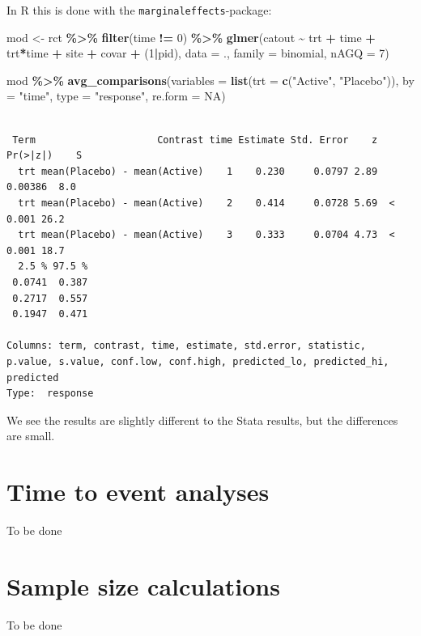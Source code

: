 \documentclass[
]{book}
\newenvironment{Shaded}{\begin{snugshade}}{\end{snugshade}}
\newcommand{\AttributeTok}[1]{\textcolor[rgb]{0.13,0.29,0.53}{#1}}
\newcommand{\ConstantTok}[1]{\textcolor[rgb]{0.56,0.35,0.01}{#1}}
\newcommand{\DecValTok}[1]{\textcolor[rgb]{0.00,0.00,0.81}{#1}}
\newcommand{\FunctionTok}[1]{\textcolor[rgb]{0.13,0.29,0.53}{\textbf{#1}}}
\newcommand{\NormalTok}[1]{#1}
\newcommand{\OtherTok}[1]{\textcolor[rgb]{0.56,0.35,0.01}{#1}}
\newcommand{\SpecialCharTok}[1]{\textcolor[rgb]{0.81,0.36,0.00}{\textbf{#1}}}
\newcommand{\StringTok}[1]{\textcolor[rgb]{0.31,0.60,0.02}{#1}}
\begin{document}
In R this is done with the \texttt{marginaleffects}-package:

\begin{Shaded}
\begin{Highlighting}[]
\NormalTok{mod }\OtherTok{\textless{}{-}}\NormalTok{ rct }\SpecialCharTok{\%\textgreater{}\%}
  \FunctionTok{filter}\NormalTok{(time }\SpecialCharTok{!=} \DecValTok{0}\NormalTok{) }\SpecialCharTok{\%\textgreater{}\%}
  \FunctionTok{glmer}\NormalTok{(catout }\SpecialCharTok{\textasciitilde{}}\NormalTok{ trt }\SpecialCharTok{+}\NormalTok{ time }\SpecialCharTok{+}\NormalTok{ trt}\SpecialCharTok{*}\NormalTok{time }\SpecialCharTok{+}\NormalTok{ site }\SpecialCharTok{+}\NormalTok{ covar }\SpecialCharTok{+}\NormalTok{ (}\DecValTok{1}\SpecialCharTok{|}\NormalTok{pid), }
        \AttributeTok{data =}\NormalTok{ ., }
        \AttributeTok{family =}\NormalTok{ binomial, }
        \AttributeTok{nAGQ =} \DecValTok{7}\NormalTok{)}

\NormalTok{mod }\SpecialCharTok{\%\textgreater{}\%}
  \FunctionTok{avg\_comparisons}\NormalTok{(}\AttributeTok{variables =} \FunctionTok{list}\NormalTok{(}\AttributeTok{trt =} \FunctionTok{c}\NormalTok{(}\StringTok{"Active"}\NormalTok{, }\StringTok{"Placebo"}\NormalTok{)), }\AttributeTok{by =} \StringTok{"time"}\NormalTok{, }\AttributeTok{type =} \StringTok{"response"}\NormalTok{, }\AttributeTok{re.form =} \ConstantTok{NA}\NormalTok{)}
\end{Highlighting}
\end{Shaded}

\begin{verbatim}

 Term                     Contrast time Estimate Std. Error    z Pr(>|z|)    S
  trt mean(Placebo) - mean(Active)    1    0.230     0.0797 2.89  0.00386  8.0
  trt mean(Placebo) - mean(Active)    2    0.414     0.0728 5.69  < 0.001 26.2
  trt mean(Placebo) - mean(Active)    3    0.333     0.0704 4.73  < 0.001 18.7
  2.5 % 97.5 %
 0.0741  0.387
 0.2717  0.557
 0.1947  0.471

Columns: term, contrast, time, estimate, std.error, statistic, p.value, s.value, conf.low, conf.high, predicted_lo, predicted_hi, predicted 
Type:  response 
\end{verbatim}

We see the results are slightly different to the Stata results, but the differences are small.

\chapter{Time to event analyses}\label{time-to-event-analyses}

To be done

\chapter{Sample size calculations}\label{sample-size-calculations}

To be done

  
\end{document}
